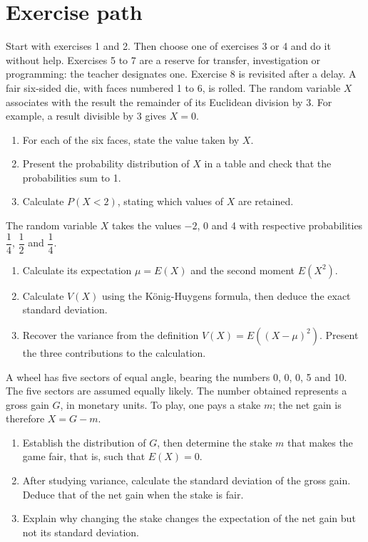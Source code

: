 \section*{Exercise path}\label{C08-PARC}
Start with exercises 1 and 2. Then choose one of exercises 3 or 4 and do it without help. Exercises 5 to 7 are a reserve for transfer, investigation or programming: the teacher designates one. Exercise 8 is revisited after a delay.
\begingroup
{}
A fair six-sided die, with faces numbered 1 to 6, is rolled. The random variable $X$ associates with the result the remainder of its Euclidean division by 3. For example, a result divisible by 3 gives $X=0$.
\begin{enumerate}[label=\arabic*.]
\item For each of the six faces, state the value taken by $X$.
\item Present the probability distribution of $X$ in a table and check that the probabilities sum to 1.
\item Calculate $P(X<2)$, stating which values of $X$ are retained.
\end{enumerate}
The random variable $X$ takes the values $-2$, 0 and 4 with respective probabilities $\dfrac14$, $\dfrac12$ and $\dfrac14$.
\begin{enumerate}[label=\arabic*.]
\item Calculate its expectation $\mu=E(X)$ and the second moment $E(X^2)$.
\item Calculate $V(X)$ using the König-Huygens formula, then deduce the exact standard deviation.
\item Recover the variance from the definition $V(X)=E((X-\mu)^2)$. Present the three contributions to the calculation.
\end{enumerate}
A wheel has five sectors of equal angle, bearing the numbers 0, 0, 0, 5 and 10. The five sectors are assumed equally likely. The number obtained represents a gross gain $G$, in monetary units. To play, one pays a stake $m$; the net gain is therefore $X=G-m$.
\begin{enumerate}[label=\arabic*.]
\item Establish the distribution of $G$, then determine the stake $m$ that makes the game fair, that is, such that $E(X)=0$.
\item After studying variance, calculate the standard deviation of the gross gain. Deduce that of the net gain when the stake is fair.
\item Explain why changing the stake changes the expectation of the net gain but not its standard deviation.
\end{enumerate}
